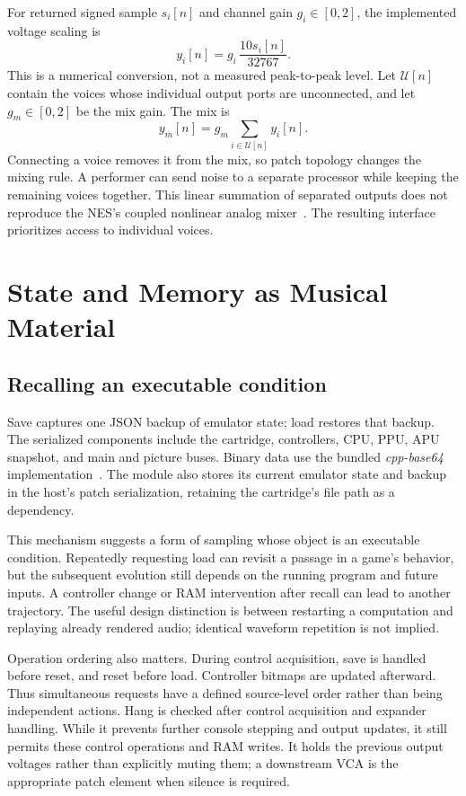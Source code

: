 \documentclass[10pt,letterpaper,twocolumn]{article}
\begin{document}
For returned signed sample $s_i[n]$ and channel gain $g_i\in[0,2]$, the
implemented voltage scaling is
\begin{equation}
 y_i[n]=g_i\,\frac{10s_i[n]}{32767}.
\end{equation}
This is a numerical conversion, not a measured peak-to-peak level. Let
$\mathcal U[n]$ contain the voices whose individual output ports are
unconnected, and let $g_m\in[0,2]$ be the mix gain. The mix is
\begin{equation}
 y_m[n]=g_m\sum_{i\in\mathcal U[n]}y_i[n].
 \label{eq:mix}
\end{equation}
Connecting a voice removes it from the mix, so patch topology changes the
mixing rule. A performer can send noise to a separate processor while keeping
the remaining voices together. This linear summation of separated outputs
does not reproduce the NES's coupled nonlinear analog mixer~\cite{nesmixer}.
The resulting interface prioritizes access to individual voices.

\section{State and Memory as Musical Material}
\subsection{Recalling an executable condition}
Save captures one JSON backup of emulator state; load restores that backup.
The serialized components include the cartridge, controllers, CPU, PPU,
APU snapshot, and main and picture buses. Binary data use the bundled
\emph{cpp-base64} implementation~\cite{base64}. The module also stores its
current emulator state and backup in the host's patch serialization, retaining
the cartridge's file path as a dependency.

This mechanism suggests a form of sampling whose object is an executable
condition. Repeatedly requesting load can revisit a passage in a game's
behavior, but the subsequent evolution still depends on the running program
and future inputs. A controller change or RAM intervention after recall can
lead to another trajectory. The useful design distinction is between
restarting a computation and replaying already rendered audio; identical
waveform repetition is not implied.

Operation ordering also matters. During control acquisition, save is handled
before reset, and reset before load. Controller bitmaps are updated afterward.
Thus simultaneous requests have a defined source-level order rather than
being independent actions. Hang is checked after control acquisition and
expander handling. While it prevents further console stepping and output
updates, it still permits these control operations and RAM writes. It holds
the previous output voltages rather than explicitly muting them; a downstream
VCA is the appropriate patch element when silence is required.
\end{document}
